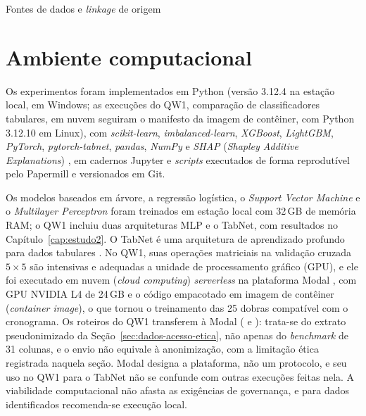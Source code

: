 \begin{chapter}{Fontes de dados e \textit{linkage} de origem}
\section{Ambiente computacional}\label{sec:ambiente-computacional}

Os experimentos foram implementados em Python (versão 3.12.4 na estação local, em Windows; as execuções do QW1, comparação de classificadores tabulares, em nuvem seguiram o manifesto da imagem de contêiner, com Python 3.12.10 em Linux), com \textit{scikit-learn}, \textit{imbalanced-learn}, \textit{XGBoost}, \textit{LightGBM}, \textit{PyTorch}, \textit{pytorch-tabnet}, \textit{pandas}, \textit{NumPy} e \textit{SHAP} (\textit{Shapley Additive Explanations}) \cite{Lundberg2017shap, Lundberg2020treeshap}, em cadernos Jupyter e \textit{scripts} executados de forma reprodutível pelo Papermill e versionados em Git.

Os modelos baseados em árvore, a regressão logística, o \textit{Support Vector Machine} e o \textit{Multilayer Perceptron} foram treinados em estação local com 32\,GB de memória RAM; o QW1 incluiu duas arquiteturas MLP e o TabNet, com resultados no Capítulo~\ref{cap:estudo2}. O TabNet é uma arquitetura de aprendizado profundo para dados tabulares \cite{Arik2021tabnet}. No QW1, suas operações matriciais na validação cruzada $5 \times 5$ são intensivas e adequadas a unidade de processamento gráfico (GPU), e ele foi executado em nuvem (\textit{cloud computing}) \textit{serverless} na plataforma Modal \cite{Modal2025}, com GPU NVIDIA L4 de 24\,GB e o código empacotado em imagem de contêiner (\textit{container image}), o que tornou o treinamento das 25 dobras compatível com o cronograma. Os roteiros do QW1 transferem  à Modal ( e ): trata-se do extrato pseudonimizado da Seção~\ref{sec:dados-acesso-etica}, não apenas do \textit{benchmark} de 31 colunas, e o envio não equivale à anonimização, com a limitação ética registrada naquela seção. Modal designa a plataforma, não um protocolo, e seu uso no QW1 para o TabNet não se confunde com outras execuções feitas nela. A viabilidade computacional não afasta as exigências de governança, e para dados identificados recomenda-se execução local.


\end{chapter}
